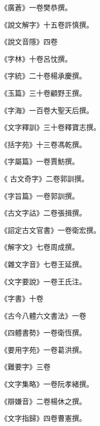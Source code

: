 \begin{pinyinscope}
 《廣蒼》一卷樊恭撰。



 《說文解字》十五卷許慎撰。



 《說文音隱》四卷



 《字林》十卷呂忱撰。



 《字統》二十卷楊承慶撰。



 《玉篇》三十卷顧野王撰。



 《字海》一百卷大聖天后撰。



 《文字釋訓》三十卷釋寶志撰。



 《括字苑》十三卷馮乾撰。



 《字屬篇》一卷賈魴撰。



 《
 古文奇字》二卷郭訓撰。



 《字旨篇》一卷郭訓撰。



 《古文字詁》二卷張揖撰。



 《詔定古文官書》一卷衛宏撰。



 《解字文》七卷周成撰。



 《雜文字音》七卷王延撰。



 《文字要說》一卷王氏注。



 《字書》十卷



 《古今八體六文書法》一卷



 《四體書勢》一卷衛恆撰。



 《要用字苑》一卷葛洪撰。



 《難要字》三卷



 《文字集略》一卷阮孝緒撰。



 《辯嫌音》二卷楊休之撰。



 《文字指歸》四卷曹憲撰。




\end{pinyinscope}

